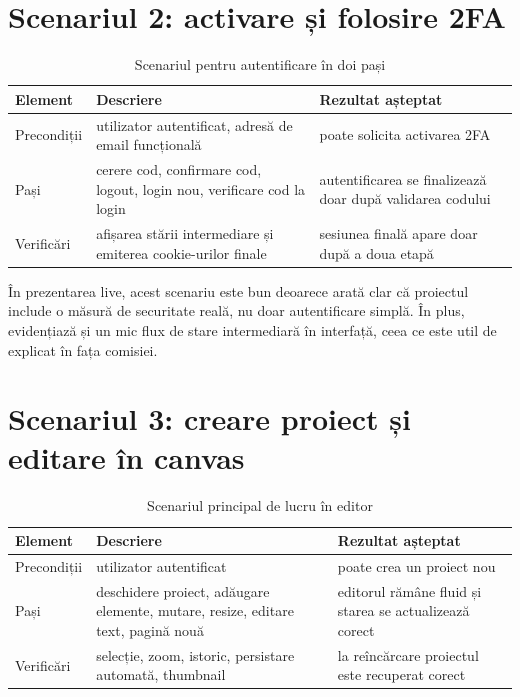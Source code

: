 \section{Scenariul 2: activare și folosire 2FA}

\begin{table}[!htbp]
  \centering
  \caption{Scenariul pentru autentificare în doi pași}
  \renewcommand{\arraystretch}{1.15}
  \begin{tabularx}{\textwidth}{>{\RaggedRight\arraybackslash}p{3.2cm}YY}
    \toprule
    \textbf{Element} & \textbf{Descriere} & \textbf{Rezultat așteptat} \\
    \midrule
    Precondiții & utilizator autentificat, adresă de email funcțională & poate solicita activarea 2FA \\
    Pași & cerere cod, confirmare cod, logout, login nou, verificare cod la login & autentificarea se finalizează doar după validarea codului \\
    Verificări & afișarea stării intermediare și emiterea cookie-urilor finale & sesiunea finală apare doar după a doua etapă \\
    \bottomrule
  \end{tabularx}
\end{table}

În prezentarea live, acest scenariu este bun deoarece arată clar că proiectul include o măsură de securitate reală, nu doar autentificare simplă. În plus, evidențiază și un mic flux de stare intermediară în interfață, ceea ce este util de explicat în fața comisiei.

\section{Scenariul 3: creare proiect și editare în canvas}

\begin{table}[!htbp]
  \centering
  \caption{Scenariul principal de lucru în editor}
  \renewcommand{\arraystretch}{1.15}
  \begin{tabularx}{\textwidth}{>{\RaggedRight\arraybackslash}p{3.2cm}YY}
    \toprule
    \textbf{Element} & \textbf{Descriere} & \textbf{Rezultat așteptat} \\
    \midrule
    Precondiții & utilizator autentificat & poate crea un proiect nou \\
    Pași & deschidere proiect, adăugare elemente, mutare, resize, editare text, pagină nouă & editorul rămâne fluid și starea se actualizează corect \\
    Verificări & selecție, zoom, istoric, persistare automată, thumbnail & la reîncărcare proiectul este recuperat corect \\
    \bottomrule
  \end{tabularx}
\end{table}

